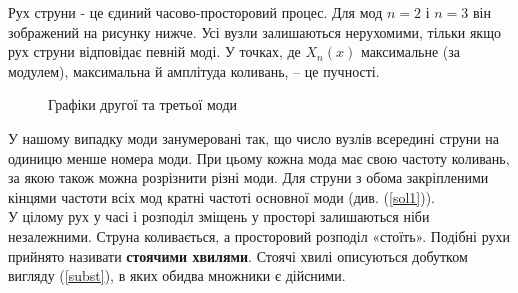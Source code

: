 Рух струни - це єдиний часово-просторовий процес. Для мод $n= 2$ і $n= 3$ він зображений на рисунку нижче. Усі вузли залишаються нерухомими, тільки якщо рух струни відповідає певній моді. У точках, де $X_n(x)$ максимальне (за модулем), максимальна й амплітуда коливань, -- це пучності.
\begin{figure}[h]
    \centering
    \caption{Графіки другої та третьої моди}
\end{figure}
У нашому випадку моди занумеровані так, що число вузлів всередині струни на одиницю менше номера моди. При цьому кожна мода має свою частоту коливань, за якою також можна розрізнити різні моди. Для струни з обома закріпленими кінцями частоти всіх мод кратні частоті основної моди (див. (\ref{sol1})).\\
У цілому рух у часі і розподіл зміщень у просторі залишаються ніби незалежними. Струна коливається, а просторовий розподіл «стоїть». Подібні рухи прийнято називати \textbf{стоячими хвилями}. Стоячі хвилі описуються добутком вигляду (\ref{subst}), в яких обидва множники є дійсними.

%
